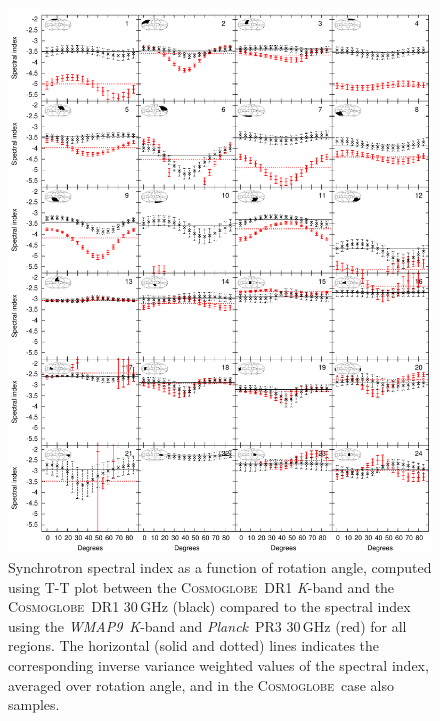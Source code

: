 \documentclass[twocolumn]{../../common/aa}
\def\WMAPnine{\emph{WMAP9}}
\def\Planck{\emph{Planck}}
\newcommand{\Cosmoglobe}{\textsc{Cosmoglobe}}
\newcommand{\K}[0]{\textit K}
\begin{document}
\begin{appendix}
\begin{figure}
        \centering
        \includegraphics[width=0.9\linewidth]{figures/cos30_ut_big_multialphaplot_converted.pdf}
        \caption{Synchrotron spectral index as a function of rotation angle, computed using T-T plot between the \Cosmoglobe\ DR1 \K-band and the \Cosmoglobe\ DR1 30\,GHz (black) compared to the spectral index using the \WMAPnine\ \K-band and \Planck\ PR3 30\,GHz (red) for all regions. The horizontal (solid and dotted) lines indicates the corresponding inverse variance weighted values of the spectral index, averaged over rotation angle, and in the \Cosmoglobe\ case also samples.}
        \label{fig:cos30_beta_bigalpha}
\end{figure}

\end{appendix}
\end{document}
